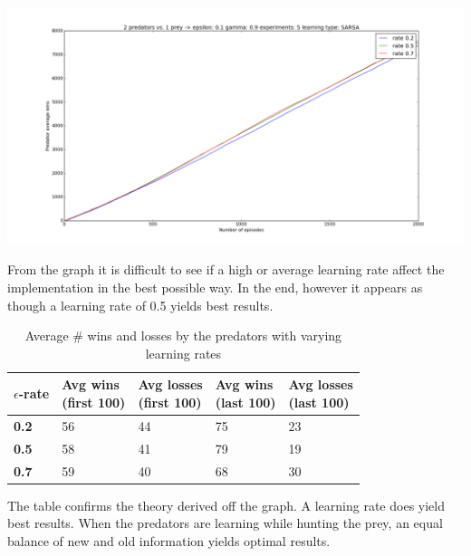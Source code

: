\begin{center}
	\includegraphics[scale=0.3]{2_predators_learning_rate_SARSA}
\end{center}

From the graph it is difficult to see if a high or average learning rate affect the implementation in the best possible way. In the end, however it appears as though a learning rate of 0.5 yields best results.

\begin{table}[H]
\begin{center}
\begin{tabular}{| l | l | l | l | l |}
\hline
\parbox{2cm}{\textbf{$\epsilon$-rate}} & \parbox{2cm}{\textbf{Avg wins \\ (first 100)}} & \parbox{2cm}{\textbf{Avg losses \\ (first 100)}} & \parbox{2cm}{\textbf{Avg wins \\ (last 100)}} & \parbox{2cm}{\textbf{Avg losses \\ (last 100)}} \\
\hline
\textbf{0.2} & 56 & 44 & 75 & 23 \\
\hline
\textbf{0.5} & 58 & 41 & 79 & 19 \\
\hline
\textbf{0.7} & 59 & 40 & 68 & 30 \\
\hline
\end{tabular}
\caption{Average \# wins and losses by the predators with varying learning rates}
\end{center}
\end{table}

The table confirms the theory derived off the graph. A learning rate does yield best results. When the predators are learning while hunting the prey, an equal balance of new and old information yields optimal results.

